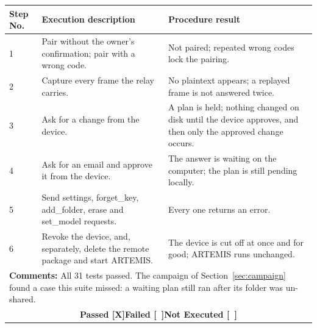 \documentclass{FastFyp}
\begin{document}
{\begin{longtable}{|p{2.4cm}p{5.0cm}p{2.4cm}p{3.8cm}|}
\multicolumn{1}{|p{2.4cm}|}{\textbf{Step No.}} &
  \multicolumn{1}{p{5.0cm}|}{\textbf{Execution description}} &
  \multicolumn{2}{p{6.6cm}|}{\textbf{Procedure result}} \\ \hline
\multicolumn{1}{|p{2.4cm}|}{1} & \multicolumn{1}{p{5.0cm}|}{Pair without the owner's confirmation; pair with a wrong code.} & \multicolumn{2}{p{6.6cm}|}{Not paired; repeated wrong codes lock the pairing.} \\ \hline
\multicolumn{1}{|p{2.4cm}|}{2} & \multicolumn{1}{p{5.0cm}|}{Capture every frame the relay carries.} & \multicolumn{2}{p{6.6cm}|}{No plaintext appears; a replayed frame is not answered twice.} \\ \hline
\multicolumn{1}{|p{2.4cm}|}{3} & \multicolumn{1}{p{5.0cm}|}{Ask for a change from the device.} & \multicolumn{2}{p{6.6cm}|}{A plan is held; nothing changed on disk until the device approves, and then only the approved change occurs.} \\ \hline
\multicolumn{1}{|p{2.4cm}|}{4} & \multicolumn{1}{p{5.0cm}|}{Ask for an email and approve it from the device.} & \multicolumn{2}{p{6.6cm}|}{The answer is waiting on the computer; the plan is still pending locally.} \\ \hline
\multicolumn{1}{|p{2.4cm}|}{5} & \multicolumn{1}{p{5.0cm}|}{Send settings, forget\_key, add\_folder, erase and set\_model requests.} & \multicolumn{2}{p{6.6cm}|}{Every one returns an error.} \\ \hline
\multicolumn{1}{|p{2.4cm}|}{6} & \multicolumn{1}{p{5.0cm}|}{Revoke the device, and, separately, delete the remote package and start ARTEMIS.} & \multicolumn{2}{p{6.6cm}|}{The device is cut off at once and for good; ARTEMIS runs unchanged.} \\ \hline
\multicolumn{4}{|p{14.8cm}|}{\textbf{Comments:} All 31 tests passed. The campaign of Section~\ref{sec:campaign} found a case this suite missed: a waiting plan still ran after its folder was un-shared.} \\ \hline
\multicolumn{4}{|c|}{\textbf{Passed [X]\quad Failed [\ ]\quad Not Executed [\ ]}} \\ \hline
\end{longtable}
}
\end{document}
